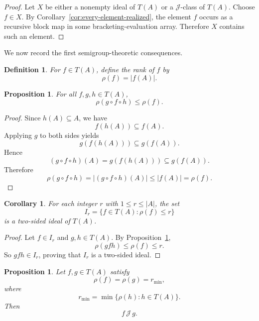 \documentclass[11pt]{article}
\newtheorem{corollary}[theorem]{Corollary}
\newtheorem{definition}[theorem]{Definition}
\newtheorem{proposition}[theorem]{Proposition}
\begin{document}
\begin{proof}
Let \(X\) be either a nonempty ideal of \(T(A)\) or a \(\mathcal J\)-class of
\(T(A)\). Choose \(f\in X\). By
Corollary~\ref{cor:every-element-realized}, the element \(f\) occurs as a
recursive block map in some bracketing-evaluation array. Therefore \(X\)
contains such an element.
\end{proof}


We now record the first semigroup-theoretic consequences.

\begin{definition}
For \(f\in T(A)\), define the rank of \(f\) by
\[
\rho(f)=|f(A)|.
\]
\end{definition}





\begin{proposition}\label{prop:rank-monotonicity}
For all \(f,g,h\in T(A)\),
\[
\rho(g\circ f\circ h)\leq \rho(f).
\]
\end{proposition}
\begin{proof}
Since \(h(A)\subseteq A\), we have
\[
f(h(A))\subseteq f(A).
\]
Applying \(g\) to both sides yields
\[
g(f(h(A)))\subseteq g(f(A)).
\]
Hence
\[
(g\circ f\circ h)(A)=g(f(h(A)))\subseteq g(f(A)).
\]
Therefore
\[
\rho(g\circ f\circ h)=|(g\circ f\circ h)(A)|
\leq |f(A)|
=\rho(f).
\]
\end{proof}


\begin{corollary}\label{cor:rank-ideals}
For each integer \(r\) with \(1\leq r\leq |A|\), the set
\[
I_r=\{f\in T(A):\rho(f)\leq r\}
\]
is a two-sided ideal of \(T(A)\).
\end{corollary}

\begin{proof}
Let \(f\in I_r\) and \(g,h\in T(A)\). By
Proposition~\ref{prop:rank-monotonicity},
\[
\rho(gfh)\leq \rho(f)\leq r.
\]
So \(gfh\in I_r\), proving that \(I_r\) is a two-sided ideal.
\end{proof}


\begin{proposition}\label{prop:min-rank-single-J-class}
Let \(f,g\in T(A)\) satisfy
\[
\rho(f)=\rho(g)=r_{\min},
\]
where
\[
r_{\min}=\min\{\rho(h):h\in T(A)\}.
\]
Then
\[
f\,\mathcal J\, g.
\]
\end{proposition}
\end{document}
